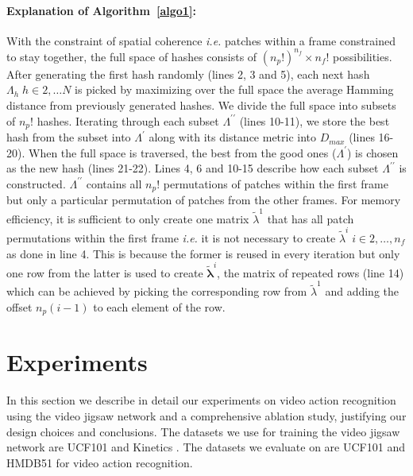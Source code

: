 \documentclass[10pt,twocolumn,letterpaper]{article}
\begin{document}
\paragraph{\textbf{Explanation of Algorithm~\ref{algo1}:}} With the constraint of spatial coherence \textit{i.e.} patches within a frame constrained to stay together, the full space of hashes consists of $(n_p!)^{n_f} \times n_f!$ possibilities. After generating the first hash randomly (lines 2, 3 and 5), each next hash $\Lambda_h\;h\in2,\dots N$ is picked by maximizing over the full space the average Hamming distance from previously generated hashes. We divide the full space into subsets of $n_p!$ hashes. Iterating through each subset $\Lambda^{\prime\prime}$ (lines 10-11), we store the best hash from the subset into $\Lambda^\prime$ along with its distance metric into $D_{max}$ (lines 16-20). When the full space is traversed, the best from the good ones ($\Lambda^\prime$) is chosen as the new hash (lines 21-22). Lines 4, 6 and 10-15 describe how each subset $\Lambda^{\prime\prime}$ is constructed. $\Lambda^{\prime\prime}$ contains all $n_p!$ permutations of patches within the first frame but only a particular permutation of patches from the other frames. For memory efficiency, it is sufficient to only create one matrix $\tilde\lambda^1$ that has all patch permutations within the first frame \textit{i.e.} it is not necessary to create $\tilde\lambda^i\;i\in2,\dots,n_f$ as done in line 4. This is because the former is reused in every iteration but only one row from the latter is used to create $\tilde{\boldsymbol\lambda}^i$, the matrix of repeated rows (line 14) which can be achieved by picking the corresponding row from $\tilde\lambda^1$ and adding the offset $n_p(i-1)$ to each element of the row.

\section{Experiments}
In this section we describe in detail our experiments on video action recognition using the video jigsaw network and a comprehensive ablation study, justifying our design choices and conclusions. The datasets we use for training the video jigsaw network are UCF101 \cite{soomro2012ucf101} and Kinetics \cite{kay2017kinetics}. The datasets we evaluate on are UCF101 \cite{soomro2012ucf101} and HMDB51 \cite{kuehne2011hmdb} for video action recognition.
\end{document}
